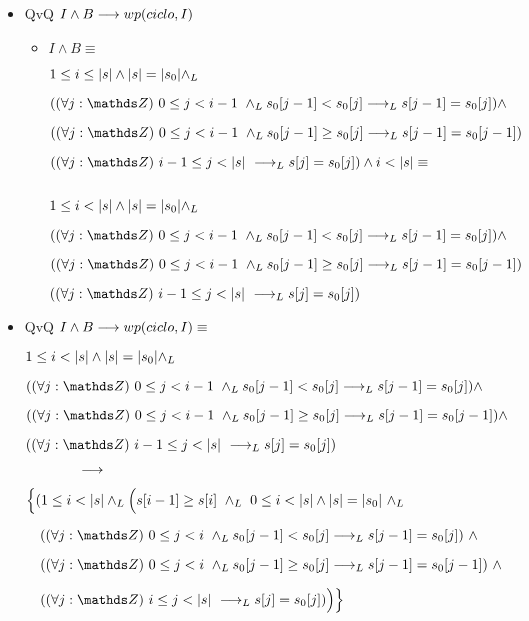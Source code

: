 \documentclass{article}
\begin{document}
    \begin{itemize}

        \item QvQ $ I \wedge B \longrightarrow wp(ciclo,I)$

        \begin{itemize}
        
            \item $I \wedge B \equiv$
        
        $1 \leq i \leq |s| \wedge |s| = |s_0| \land _L$

        $(\paraTodo{j}{0}{i-1} \yLuego s_0[j-1] < s_0[j] \implicaLuego s[j-1] = s_0[j]) \wedge $

        $(\paraTodo{j}{0}{i-1} \yLuego s_0[j-1] \geq s_0[j] \implicaLuego s[j-1] = s_0[j-1])$

        $(\paraTodo{j}{i-1}{\longitud{s}} \implicaLuego s[j] = s_0[j]) \wedge i < \longitud{s} \equiv $

        $ $ 

        $1 \leq i < |s| \wedge |s| = |s_0| \land _L$

        $(\paraTodo{j}{0}{i-1} \yLuego s_0[j-1] < s_0[j] \implicaLuego s[j-1] = s_0[j]) \wedge $

        $(\paraTodo{j}{0}{i-1} \yLuego s_0[j-1] \geq s_0[j] \implicaLuego s[j-1] = s_0[j-1])$

        $(\paraTodo{j}{i-1}{\longitud{s}} \implicaLuego s[j] = s_0[j])$

        \end{itemize}

        \item QvQ $ I \wedge B \longrightarrow wp(ciclo,I) \equiv $

        $ 1 \leq i < |s| \wedge |s| = |s_0| \land _L$

        $ (\paraTodo{j}{0}{i-1} \yLuego s_0[j-1] < s_0[j] \implicaLuego s[j-1] = s_0[j]) \wedge $

        $ (\paraTodo{j}{0}{i-1} \yLuego s_0[j-1] \geq s_0[j] \implicaLuego s[j-1] = s_0[j-1]) \wedge$

        $ (\paraTodo{j}{i-1}{\longitud{s}} \implicaLuego s[j] = s_0[j])$

        $ \qquad\qquad \longrightarrow$

        $ \Big\{(1 \leq i < |s| \land _L \Big( s[i-1] \geq s[i]\ \land _L\ 0 \leq i < |s| \wedge |s| = |s_0|\ \land _L $

        $ \quad (\paraTodo{j}{0}{i} \yLuego s_0[j-1] < s_0[j] \implicaLuego s[j-1] = s_0[j])\ \wedge $

        $ \quad (\paraTodo{j}{0}{i} \yLuego s_0[j-1] \geq s_0[j] \implicaLuego s[j-1] = s_0[j-1])\ \wedge $

        $ \quad (\paraTodo{j}{i}{\longitud{s}} \implicaLuego s[j] = s_0[j]) \Big) \Big\}\ $

    \end{itemize}
\end{document}
